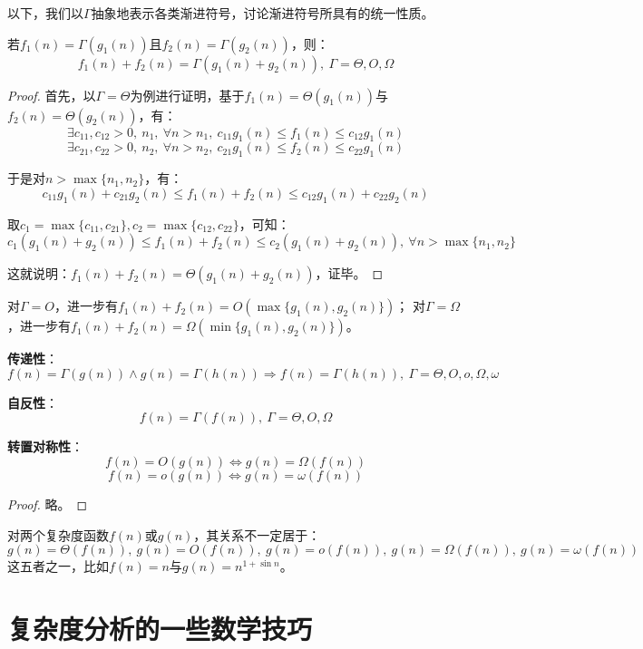 \documentclass[12pt,a4paper,violet]{bbe}
\begin{document}
以下，我们以$\Gamma$抽象地表示各类渐进符号，讨论渐进符号所具有的统一性质。
\begin{property}
	若$f_1(n)=\Gamma(g_1(n))$且$f_2(n)=\Gamma(g_2(n))$，则：
	$$
	f_1(n)+f_2(n)=\Gamma(g_1(n)+g_2(n)),~\Gamma=\Theta,O,\Omega
	$$
\end{property}
\begin{proof}
	首先，以$\Gamma=\Theta$为例进行证明，基于$f_1(n)=\Theta(g_1(n))$与$f_2(n)=\Theta(g_2(n))$，有：
$$
\exists c_{11},c_{12}>0,~n_1,~\forall n>n_1,~c_{11}g_1(n)\leqslant f_1(n)\leqslant c_{12}g_1(n)
$$
$$
\exists c_{21},c_{22}>0,~n_2,~\forall n>n_2,~c_{21}g_1(n)\leqslant f_2(n)\leqslant c_{22}g_1(n)
$$

于是对$n>\max\{n_1,n_2\}$，有：
$$
c_{11}g_1(n)+c_{21}g_2(n)\leqslant f_1(n)+f_2(n)\leqslant c_{12}g_1(n)+c_{22}g_2(n)
$$

取$c_1=\max\{c_{11},c_{21}\},c_2=\max\{c_{12},c_{22}\}$，可知：
$$
c_1(g_1(n)+g_2(n))\leqslant f_1(n)+f_2(n) \leqslant c_2(g_1(n)+g_2(n)),~\forall n>\max\{n_1,n_2\}
$$

这就说明：$f_1(n)+f_2(n)=\Theta(g_1(n)+g_2(n))$，证毕。
\end{proof}
\begin{remark}
	对$\Gamma=O$，进一步有$f_1(n)+f_2(n)=O(\max\{g_1(n),g_2(n)\})$；	对$\Gamma=\Omega$，进一步有$f_1(n)+f_2(n)=\Omega(\min\{g_1(n),g_2(n)\})$。
\end{remark}
\begin{property}
\textbf{传递性}：
	$$
	f(n)=\Gamma(g(n))\wedge g(n)=\Gamma(h(n))\Rightarrow f(n)=\Gamma(h(n)),~\Gamma=\Theta,O,o,\Omega,\omega
	$$
\end{property}
\begin{property}
\textbf{自反性}：
	$$
	f(n)=\Gamma(f(n)),~\Gamma=\Theta,O,\Omega
	$$
\end{property}
\begin{property}
\textbf{转置对称性}：
	$$
	f(n)=O(g(n))\Leftrightarrow g(n)=\Omega(f(n))
	$$
	$$
	f(n)=o(g(n))\Leftrightarrow g(n)=\omega(f(n))
	$$
\end{property}
\begin{proof}
	略。
\end{proof}
\begin{remark}
	对两个复杂度函数$f(n)$或$g(n)$，其关系不一定居于：
	$$
	g(n)=\Theta(f(n)),~g(n)=O(f(n)),~g(n)=o(f(n)),~g(n)=\Omega(f(n)),~g(n)=\omega(f(n))
	$$
	这五者之一，比如$f(n)=n$与$g(n)=n^{1+\sin n}$。
\end{remark}
\section{复杂度分析的一些数学技巧}
\end{document}
